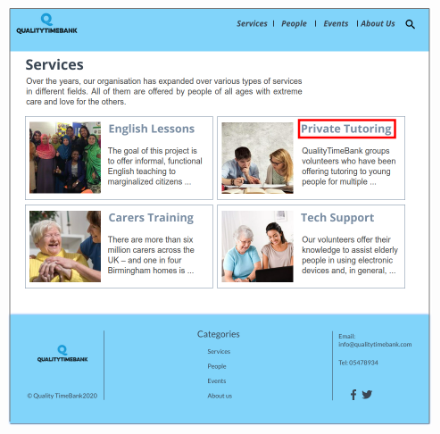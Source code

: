 \documentclass[a4paper, 11pt, parskip=half, headsepline]{scrreprt}
\begin{document}
\begin{figure}[H]
    \hspace*{\fill}
    \begin{minipage}[t]{0.5\textwidth}
        \centering
    	\includegraphics[width=1\linewidth, keepaspectratio]{scenarios/scenario-12}
    	\caption{}
    	\label{fig:scenario-12}
    \end{minipage}
\end{figure}
\end{document}

